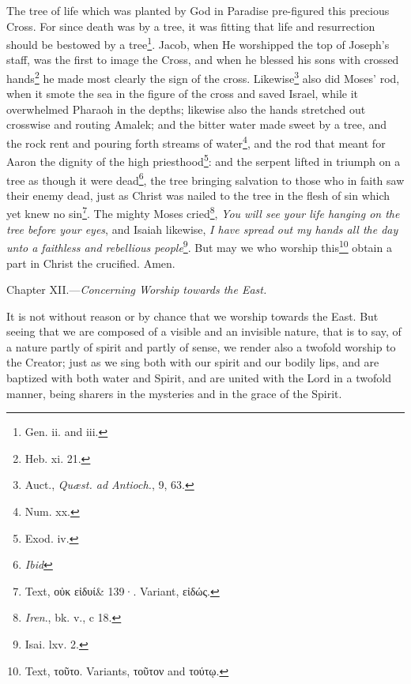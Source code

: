 The tree of life which was planted by God in Paradise pre-figured this precious Cross. For since death was by a tree, it was fitting that life and resurrection should be bestowed by a tree\footnote{Gen. ii. and iii.}. Jacob, when He worshipped the top of Joseph’s staff, was the first to image the Cross, and when he blessed his sons with crossed hands\footnote{Heb. xi. 21.} he made most clearly the sign of the cross. Likewise\footnote{Auct., \emph{Quæst. ad Antioch.}, 9, 63.} also did Moses’ rod, when it smote the sea in the figure of the cross and saved Israel, while it overwhelmed Pharaoh in the depths; likewise also the hands stretched out crosswise and routing Amalek; and the bitter water made sweet by a tree, and the rock rent and pouring forth streams of water\footnote{Num. xx.}, and the rod that meant for Aaron the dignity of the high priesthood\footnote{Exod. iv.}: and the serpent lifted in triumph on a tree as though it were dead\footnote{\emph{Ibid}}, the tree bringing salvation to those who in faith saw their enemy dead, just as Christ was nailed to the tree in the flesh of sin which yet knew no sin\footnote{Text, \textgreek{οὐκ εἰδυί\& 139·}. Variant, \textgreek{εἰδώς}.}. The mighty Moses cried\footnote{\emph{Iren}., bk. v., c 18.}, \emph{You will see your life hanging on the tree before your eyes}, and Isaiah likewise, \emph{I have spread out my hands all the day unto a faithless and rebellious people}\footnote{Isai. lxv. 2.}. But may we who worship this\footnote{Text, \textgreek{τοῦτο}. Variants, \textgreek{τοῦτον} and \textgreek{τούτῳ}.} obtain a part in Christ the crucified. Amen.


Chapter XII.—\emph{Concerning Worship towards the East.}

It is not without reason or by chance that we worship towards the East. But seeing that we are composed of a visible and an invisible nature, that is to say, of a nature partly of spirit and partly of sense, we render also a twofold worship to the Creator; just as we sing both with our spirit and our bodily lips, and are baptized with both water and Spirit, and are united with the Lord in a twofold manner, being sharers in the mysteries and in the grace of the Spirit.

